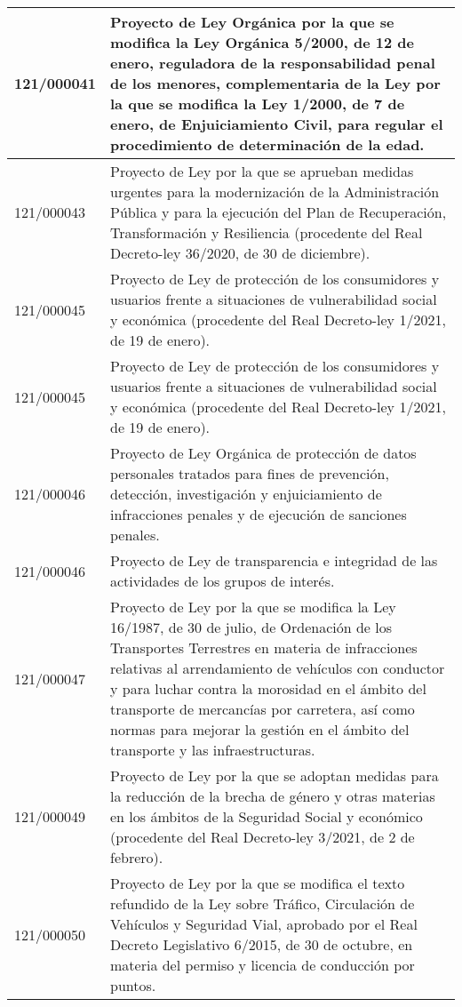 {\begin{table}[H]
\begin{center}
\begin{tabularx}{\linewidth}{| l | X |}
\hline
121/000041 & Proyecto de Ley Orgánica por la que se modifica la Ley Orgánica 5/2000, de 12 de enero, reguladora de la responsabilidad penal de los menores, complementaria de la Ley por la que se modifica la Ley 1/2000, de 7 de enero, de Enjuiciamiento Civil, para regular el procedimiento de determinación de la edad. \\
\hline
121/000043 & Proyecto de Ley por la que se aprueban medidas urgentes para la modernización de la Administración Pública y para la ejecución del Plan de Recuperación, Transformación y Resiliencia (procedente del Real Decreto-ley 36/2020, de 30 de diciembre). \\
\hline
121/000045 & Proyecto de Ley de protección de los consumidores y usuarios frente a situaciones de vulnerabilidad social y económica (procedente del Real Decreto-ley 1/2021, de 19 de enero). \\
\hline
121/000045 & Proyecto de Ley de protección de los consumidores y usuarios frente a situaciones de vulnerabilidad social y económica (procedente del Real Decreto-ley 1/2021, de 19 de enero). \\
\hline
121/000046 & Proyecto de Ley Orgánica de protección de datos personales tratados para fines de prevención, detección, investigación y enjuiciamiento de infracciones penales y de ejecución de sanciones penales. \\
\hline
121/000046 & Proyecto de Ley de transparencia e integridad de las actividades de los grupos de interés. \\
\hline
121/000047 & Proyecto de Ley por la que se modifica la Ley 16/1987, de 30 de julio, de Ordenación de los Transportes Terrestres en materia de infracciones relativas al arrendamiento de vehículos con conductor y para luchar contra la morosidad en el ámbito del transporte de mercancías por carretera, así como normas para mejorar la gestión en el ámbito del transporte y las infraestructuras. \\
\hline
121/000049 & Proyecto de Ley por la que se adoptan medidas para la reducción de la brecha de género y otras materias en los ámbitos de la Seguridad Social y económico (procedente del Real Decreto-ley 3/2021, de 2 de febrero). \\
\hline
121/000050 & Proyecto de Ley por la que se modifica el texto refundido de la Ley sobre Tráfico, Circulación de Vehículos y Seguridad Vial, aprobado por el Real Decreto Legislativo 6/2015, de 30 de octubre, en materia del permiso y licencia de conducción por puntos. \\

\end{tabularx}
\end{center}
\end{table}}
